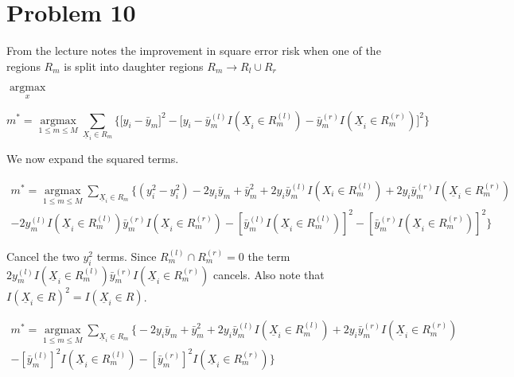 \documentclass[11pt]{article}
\begin{document}
\section*{Problem 10}
\setlength{\parindent}{0pt}

From the lecture notes the improvement in square error risk when one of the 
regions $R_m$ is split into daughter regions $R_m \to R_l \cup R_r$

$\underset{x}{\operatorname{argmax}}$

\begin{equation}
m^* = \underset{1 \leq m \leq M}{\operatorname{argmax}} \sum_{\underline{X}_i \in R_m} \Bigg\{\Big[y_i-\bar{y}_m\Big]^2-\Big[y_i - \bar{y}_m^{(l)}I(\underline{X}_i \in R_m^{(l)})-\bar{y}_m^{(r)}I(\underline{X}_i \in R_m^{(r)})\Big]^2\Bigg\}
\end{equation}

We now expand the squared terms. 

\begin{equation}
\begin{split}
m^* = \underset{1 \leq m \leq M}{\operatorname{argmax}} \sum_{\underline{X}_i \in R_m} \Bigg\{(y_i^2-y_i^2) -2y_i\bar{y}_m + \bar{y}_m^2 +2y_i\bar{y}_m^{(l)}I(X_i \in R_m^{(l)}) +2y_i\bar{y}_m^{(r)}I(\underline{X}_i \in R_m^{(r)}) \\- 2y_m^{(l)}I(\underline{X}_i \in R_m^{(l)})\bar{y}_m^{(r)}I(\underline{X}_i \in R_m^{(r)})-[\bar{y}_m^{(l)}I(\underline{X}_i \in R_m^{(l)})]^2-[\bar{y}_m^{(r)}I(\underline{X}_i \in R_m^{(r)})]^2\Bigg\}
\end{split}
\end{equation}

Cancel the two $y_i^2$ terms. Since $R_m^{(l)} \cap R_m^{(r)} = 0$ the term  
$2y_m^{(l)}I(\underline{X}_i \in R_m^{(l)})\bar{y}_m^{(r)}I(\underline{X}_i \in R_m^{(r)})$ 
cancels. Also note that $I(\underline{X}_i \in R)^2 = I(\underline{X}_i \in R)$.

\begin{equation}
\begin{split}
m^* = \underset{1 \leq m \leq M}{\operatorname{argmax}} \sum_{\underline{X}_i \in R_m} \Bigg\{-2y_i\bar{y}_m + \bar{y}_m^2 + 2y_i\bar{y}_m^{(l)}I(\underline{X}_i \in R_m^{(l)}) + 2y_i\bar{y}_m^{(r)}I(\underline{X}_i \in R_m^{(r)})\\ - [\bar{y}_m^{(l)}]^2I(\underline{X}_i \in R_m^{(l)}) - [\bar{y}_m^{(r)}]^2I(\underline{X}_i \in R_m^{(r)})\Bigg\}
\end{split}
\end{equation}
\end{document}
